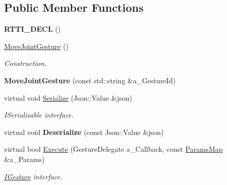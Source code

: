 \subsection*{Public Member Functions}
\begin{DoxyCompactItemize}
\item 
\mbox{\label{class_move_joint_gesture_ad06c6d93af134d7fa751760f2675591e}} 
{\bfseries R\+T\+T\+I\+\_\+\+D\+E\+CL} ()
\item 
\mbox{\label{class_move_joint_gesture_a6a705eec17c1cf1a4bdf4a94819a38b4}} 
\hyperlink{class_move_joint_gesture_a6a705eec17c1cf1a4bdf4a94819a38b4}{Move\+Joint\+Gesture} ()
\begin{DoxyCompactList}\small\item\em Construction. \end{DoxyCompactList}\item 
\mbox{\label{class_move_joint_gesture_a9f3aa3e7c957ca1e5e1f9d36942d5a61}} 
{\bfseries Move\+Joint\+Gesture} (const std\+::string \&a\+\_\+\+Gesture\+Id)
\item 
\mbox{\label{class_move_joint_gesture_ad65de51279001cf45bd709857cb2e081}} 
virtual void \hyperlink{class_move_joint_gesture_ad65de51279001cf45bd709857cb2e081}{Serialize} (Json\+::\+Value \&json)
\begin{DoxyCompactList}\small\item\em I\+Serializable interface. \end{DoxyCompactList}\item 
\mbox{\label{class_move_joint_gesture_a80e84475f200050e54ea4fa50eb221c6}} 
virtual void {\bfseries Deserialize} (const Json\+::\+Value \&json)
\item 
\mbox{\label{class_move_joint_gesture_a05ffbd58e927b0f42aba6756925602ea}} 
virtual bool \hyperlink{class_move_joint_gesture_a05ffbd58e927b0f42aba6756925602ea}{Execute} (Gesture\+Delegate a\+\_\+\+Callback, const \hyperlink{class_params_map}{Params\+Map} \&a\+\_\+\+Params)
\begin{DoxyCompactList}\small\item\em \hyperlink{class_i_gesture}{I\+Gesture} interface. \end{DoxyCompactList}\item 

\end{DoxyCompactItemize}
